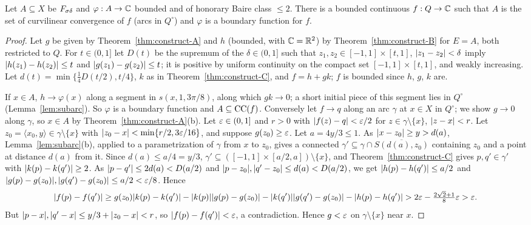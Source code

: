 \begin{theorem}\label{thm:construct-D}
Let $A\subseteq X$ be $F_{\sigma\delta}$ and $\varphi:A\to\mathbb{C}$ bounded and of honorary Baire class $\le2$. There is a bounded continuous
$f:Q\to\mathbb{C}$ such that $A$ is the set of curvilinear convergence of $f$ (arcs in $Q^\circ$) and $\varphi$ is a boundary
function for $f$.
\end{theorem}
\begin{proof}
Let $g$ be given by Theorem~\ref{thm:construct-A} and $h$ (bounded, with $\mathbb{C}=\mathbb{R}^2$) by Theorem~\ref{thm:construct-B} for
$E=A$, both restricted to $Q$. For $t\in(0,1]$ let $D(t)$ be the supremum of the $\delta\in(0,1]$ such that
$z_1,z_2\in[-1,1]\times[t,1]$, $\lvert z_1-z_2\rvert<\delta$ imply $\lvert h(z_1)-h(z_2)\rvert\le t$ and $\lvert g(z_1)-g(z_2)\rvert\le t$;
it is positive by uniform continuity on the compact set $[-1,1]\times[t,1]$, and weakly increasing. Let
$d(t)=\min\{\frac14D(t/2),t/4\}$, $k$ as in Theorem~\ref{thm:construct-C}, and $f=h+gk$; $f$ is bounded since $h$, $g$, $k$ are.

If $x\in A$, $h\to\varphi(x)$ along a segment in $s(x,1,3\pi/8)$, along which $gk\to0$; a short initial piece of this
segment lies in $Q^\circ$ (Lemma~\ref{lem:subarc}). So $\varphi$ is a boundary function and $A\subseteq\operatorname{CC}(f)$. Conversely
let $f\to q$ along an arc $\gamma$ at $x\in X$ in $Q^\circ$; we show $g\to0$ along $\gamma$, so $x\in A$ by
Theorem~\ref{thm:construct-A}(b). Let $\varepsilon\in(0,1]$ and $r>0$ with $\lvert f(z)-q\rvert<\varepsilon/2$ for $z\in\gamma\setminus\{x\}$,
$\lvert z-x\rvert<r$. Let $z_0=\langle x_0,y\rangle\in\gamma\setminus\{x\}$ with $\lvert z_0-x\rvert<\min\{r/2,3\varepsilon/16\}$, and suppose
$g(z_0)\ge\varepsilon$. Let $a=4y/3\le1$. As $\lvert x-z_0\rvert\ge y>d(a)$, Lemma~\ref{lem:subarc}(b), applied to a parametrization of
$\gamma$ from $x$ to $z_0$, gives a connected $\gamma'\subseteq\gamma\cap\overline{S(d(a),z_0)}$ containing $z_0$ and a
point at distance $d(a)$ from it. Since $d(a)\le a/4=y/3$, $\gamma'\subseteq([-1,1]\times[a/2,a])\setminus\{x\}$, and
Theorem~\ref{thm:construct-C} gives $p,q'\in\gamma'$ with $\lvert k(p)-k(q')\rvert\ge2$. As $\lvert p-q'\rvert\le2d(a)<D(a/2)$ and
$\lvert p-z_0\rvert,\lvert q'-z_0\rvert\le d(a)<D(a/2)$, we get $\lvert h(p)-h(q')\rvert\le a/2$ and
$\lvert g(p)-g(z_0)\rvert,\lvert g(q')-g(z_0)\rvert\le a/2<\varepsilon/8$. Hence
\[
\lvert f(p)-f(q')\rvert\ge g(z_0)\lvert k(p)-k(q')\rvert-\lvert k(p)\rvert\lvert g(p)-g(z_0)\rvert-\lvert k(q')\rvert\lvert g(q')-g(z_0)\rvert-\lvert h(p)-h(q')\rvert
>2\varepsilon-\tfrac{2\sqrt2+1}8\varepsilon>\varepsilon .
\]
But $\lvert p-x\rvert,\lvert q'-x\rvert\le y/3+\lvert z_0-x\rvert<r$, so $\lvert f(p)-f(q')\rvert<\varepsilon$, a contradiction. Hence $g<\varepsilon$ on
$\gamma\setminus\{x\}$ near $x$.
\end{proof}

